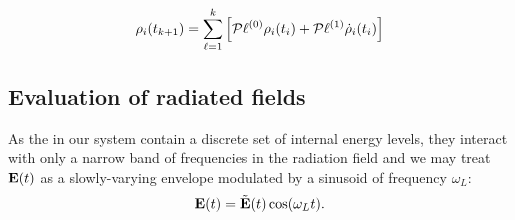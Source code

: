 \begin{equation}
  \rho_i(t_{k + 1}) = \sum_{\ell = 1}^k \qty[\mathcal{P} \ell^{\qty(0)} \rho_i(t_i) + \mathcal{P} \ell^{\qty(1)} \dot{\rho}_i(t_i)]
\end{equation}


\subsection{Evaluation of radiated fields}

As the \qds{} in our system contain a discrete set of internal energy levels, they interact with only a narrow band of frequencies in the radiation field and we may treat $\vb{E}(t)$ as a slowly-varying envelope modulated by a sinusoid of frequency $\omega_L$:
\begin{equation}
  \vb{E}(t) = \tilde{\vb{E}}(t)\cos(\omega_L t).
  \label{eq:modulated field}
\end{equation}

